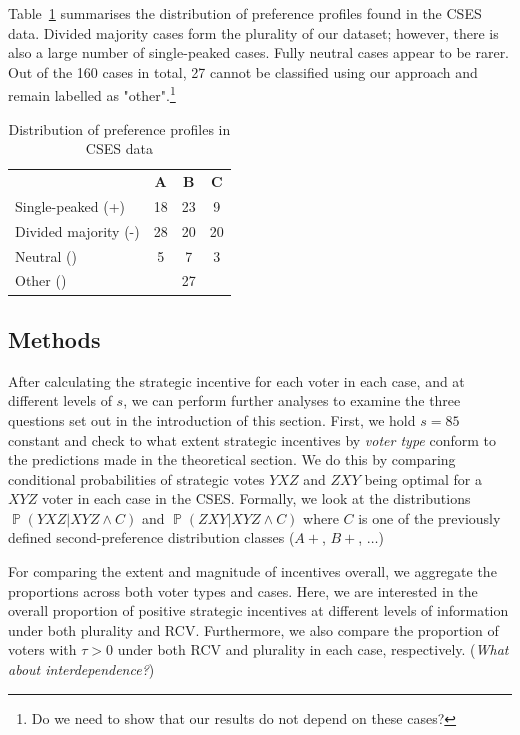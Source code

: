 \documentclass[11pt, letter]{article}
\DeclareMathOperator{\Prob}{\mathbb{P}}
\begin{document}
Table~\ref{tab:csesprefs} summarises the distribution of preference profiles found in the CSES data. Divided majority cases form the plurality of our dataset; however, there is also a large number of single-peaked cases. Fully neutral cases appear to be rarer. Out of the 160 cases in total, 27 cannot be classified using our approach and remain labelled as "other".\footnote{Do we need to show that our results do not depend on these cases?}

\begin{table}[tb]
	\caption{Distribution of preference profiles in CSES data}
	\label{tab:csesprefs}
	\centering

	\begin{tabular}{lccc}
	\hline

	\toprule
	\textbf{} & \textbf{A} & \textbf{B} & \textbf{C} \\
	\cmidrule{2-4}
	Single-peaked (+) & 18 & 23 & 9  \\
	Divided majority (-) & 28 & 20 & 20  \\
	Neutral () & 5 & 7 & 3  \\
	Other () & & 27 &  \\
	\bottomrule
	\end{tabular}
\end{table}

\subsection{Methods}


After calculating the strategic incentive for each voter in each case, and at different levels of $s$, we can perform further analyses to examine the three questions set out in the introduction of this section. First, we hold $s = 85$ constant and check to what extent strategic incentives by \emph{voter type} conform to the predictions made in the theoretical section. We do this by comparing conditional probabilities of strategic votes $YXZ$ and $ZXY$ being optimal for a $XYZ$ voter in each case in the CSES. Formally, we look at the distributions $\Prob(YXZ | XYZ \land C)$ and $\Prob(ZXY | XYZ \land C)$ where $C$ is one of the previously defined second-preference distribution classes ($A+$, $B+$, $\ldots$)

For comparing the extent and magnitude of incentives overall, we aggregate the proportions across both voter types and cases. Here, we are interested in the overall proportion of positive strategic incentives at different levels of information under both plurality and RCV. Furthermore, we also compare the proportion of voters with $\tau > 0$ under both RCV and plurality in each case, respectively. (\emph{What about interdependence?})
\end{document}
